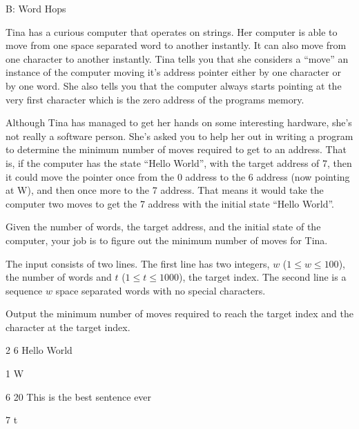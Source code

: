 \begin{problem}{B: Word Hops}

Tina has a curious computer that operates on strings.
Her computer is able to move from one space separated word to another instantly.
It can also move from one character to another instantly.
Tina tells you that she considers a ``move'' an instance of the computer moving it's address pointer either by one character or by one word.
She also tells you that the computer always starts pointing at the very first character which is the zero address of the programs memory.

Although Tina has managed to get her hands on some interesting hardware, she's not really a software person.
She's asked you to help her out in writing a program to determine the minimum number of moves required to get to an address.
That is, if the computer has the state ``Hello World'', with the target address of 7, then it could move the pointer once from the 0 address to the 6 address (now pointing at W), and then once more to the 7 address.
That means it would take the computer two moves to get the 7 address with the initial state ``Hello World''.

Given the number of words, the target address, and the initial state of the computer, your job is to figure out the minimum number of moves for Tina.

\end{problem}

\begin{formalin}
The input consists of two lines.
The first line has two integers, $w$ ($1 \leq w \leq 100$), the number of words and $t$ ($1 \leq t \leq 1000$), the target index.
The second line is a sequence $w$ space separated words with no special characters.
\end{formalin}

\begin{formalout}
Output the minimum number of moves required to reach the target index and the character at the target index.
\end{formalout}

\begin{datain}
2 6
Hello World
\end{datain}
\begin{dataout}
1 W
\end{dataout}


\begin{datain}
6 20
This is the best sentence ever
\end{datain}
\begin{dataout}
7 t
\end{dataout}
